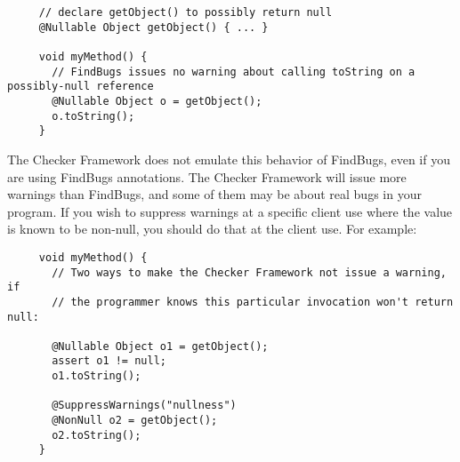 \begin{Verbatim}
     // declare getObject() to possibly return null
     @Nullable Object getObject() { ... }

     void myMethod() {
       // FindBugs issues no warning about calling toString on a possibly-null reference
       @Nullable Object o = getObject();
       o.toString();
     }
\end{Verbatim}

The Checker Framework does not emulate this behavior of FindBugs, even if
you are using FindBugs annotations.
The Checker Framework will issue more warnings than FindBugs, and some of
them may be about real bugs in your program.
If you wish to suppress warnings at a
specific client use where the value is known to be non-null, you should do that
at the client use.  For example:

\begin{Verbatim}
     void myMethod() {
       // Two ways to make the Checker Framework not issue a warning, if
       // the programmer knows this particular invocation won't return null:

       @Nullable Object o1 = getObject();
       assert o1 != null;
       o1.toString();

       @SuppressWarnings("nullness")
       @NonNull o2 = getObject();
       o2.toString();
     }
\end{Verbatim}



